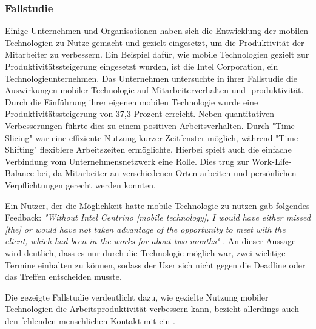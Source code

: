 \documentclass[12pt,a4paper]{article}
\begin{document}
\subsubsection*{Fallstudie}
Einige Unternehmen und Organisationen haben sich die Entwicklung der mobilen Technologien zu Nutze gemacht und gezielt eingesetzt, um die Produktivität der Mitarbeiter zu verbessern. Ein Beispiel dafür, wie mobile Technologien gezielt zur Produktivitätssteigerung eingesetzt wurden, ist die Intel Corporation, ein Technologieunternehmen. Das Unternehmen untersuchte in ihrer Fallstudie die Auswirkungen mobiler Technologie auf Mitarbeiterverhalten und -produktivität. Durch die Einführung ihrer eigenen mobilen Technologie wurde eine Produktivitätssteigerung von 37,3 Prozent erreicht. Neben quantitativen Verbesserungen führte dies zu einem positiven Arbeitsverhalten. Durch "Time Slicing" war eine effiziente Nutzung kurzer Zeitfenster möglich, während "Time Shifting" flexiblere Arbeitszeiten ermöglichte. Hierbei spielt auch die einfache Verbindung vom Unternehmensnetzwerk eine Rolle. Dies trug zur Work-Life-Balance bei, da Mitarbeiter an verschiedenen Orten arbeiten und persönlichen Verpflichtungen gerecht werden konnten. 

	Ein Nutzer, der die Möglichkeit hatte mobile Technologie zu nutzen gab folgendes Feedback: 
	\emph{"Without Intel Centrino [mobile technology], I would have either missed [the] or would have not taken advantage of the opportunity to meet with the client, which had been in the works for about two months"}  \parencite{govindaraju2005effects}. An dieser Aussage wird deutlich, dass es nur durch die Technologie möglich war, zwei wichtige Termine einhalten zu können, sodass der User sich nicht gegen die Deadline oder das Treffen entscheiden musste.

	Die gezeigte Fallstudie verdeutlicht dazu, wie gezielte Nutzung mobiler Technologien die Arbeitsproduktivität verbessern kann, bezieht allerdings auch den fehlenden menschlichen Kontakt mit ein \parencite[vgl.][]{govindaraju2005effects}.
\end{document}
